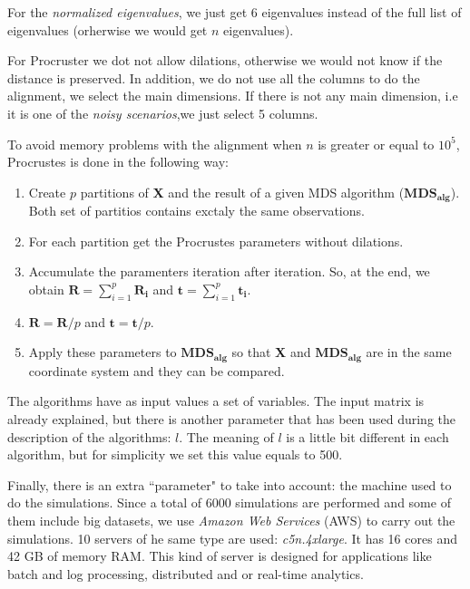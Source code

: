 \documentclass[11pt]{report}
\begin{document}
\indent For the \textit{normalized eigenvalues}, we just get 6 eigenvalues 
instead of the full list of eigenvalues (orherwise we would get $n$ 
eigenvalues). 

\indent For Procruster we dot not allow dilations, otherwise we would not
know if the distance is preserved. In addition, we do not use all the columns 
to do the alignment, we select the main dimensions. If there is not any
main dimension, i.e it is one of the \textit{noisy scenarios},we just select 5 
columns. 

\indent To avoid memory problems with the alignment when $n$ is greater or 
equal to $10^5$, Procrustes is done in the following way:

\begin{enumerate}

\item Create $p$ partitions of \textbf{X} and the result of a given MDS 
algorithm ($\mathbf{MDS_{alg}}$). Both set of partitios contains exctaly the
same observations.


\item For each partition get the Procrustes parameters without dilations.

\item Accumulate the paramenters iteration after iteration. So, at the end, 
we obtain $\mathbf{R} = \sum_{i = 1}^p \mathbf{R_i}$ and 
$\mathbf{t} = \sum_{i = 1}^p \mathbf{t_i}$.

\item $\mathbf{R} = \mathbf{R}/p$ and $\mathbf{t} = \mathbf{t}/p$.

\item Apply these parameters to $\mathbf{MDS_{alg}}$ so that 
\textbf{X} and $\mathbf{MDS_{alg}}$ are in the same coordinate system and
they can be compared.


\end{enumerate}

\indent The algorithms have as input values a set of variables. The input matrix 
is already explained, but there is another parameter that has been used during 
the description of the algorithms: $l$. The meaning of $l$ is a little bit 
different in each algorithm, but for simplicity we set this value
equals to 500.

\indent Finally, there is an extra ``parameter" to take into account: the 
machine used to do the simulations. Since a total of 6000 simulations are
performed and some of them include big datasets, we use 
\textit{Amazon Web Services} (AWS) to carry out the simulations. 
10 servers of he same type are used: \textit{c5n.4xlarge}. It 
has 16 cores and 42 GB of memory RAM. This kind of server is designed for 
applications like batch and log processing, distributed and or 
real-time analytics. 
\end{document}
